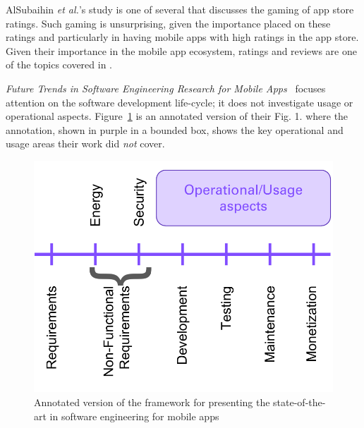 AlSubaihin \emph{et al.}'s study is one of several that discusses the gaming of app store ratings. Such gaming is unsurprising, given the importance placed on these ratings and particularly in having mobile apps with high ratings in the app store. Given their importance in the mobile app ecosystem, ratings and reviews are one of the topics covered in .

\emph{Future Trends in Software Engineering Research for Mobile Apps}~ focuses attention on the software development life-cycle; it does not investigate usage or operational aspects. Figure~\ref{fig:nagappan2016_future_trends_in_sw_eng_for_mobile_apps_figure_1_annotated} is an annotated version of their Fig. 1.  where the annotation, shown in purple in a bounded box, shows the key operational and usage areas their work did \emph{not} cover. 


\begin{figure}
    \centering
    \includegraphics[width=\linewidth]{images/my/framework-for-presenting-the-state-of-the-art-in-sw-end-for-mobile-apps.pdf}
    \caption[Framework for presenting the state-of-the-art in software engineering for mobile apps, adapted from~\cite{nagappan2016_future_trends_in_sw_eng_for_mobile_apps}]{Annotated version of the framework for presenting the state-of-the-art in software engineering for mobile apps~\cite{nagappan2016_future_trends_in_sw_eng_for_mobile_apps}}
    \label{fig:nagappan2016_future_trends_in_sw_eng_for_mobile_apps_figure_1_annotated}
\end{figure}


